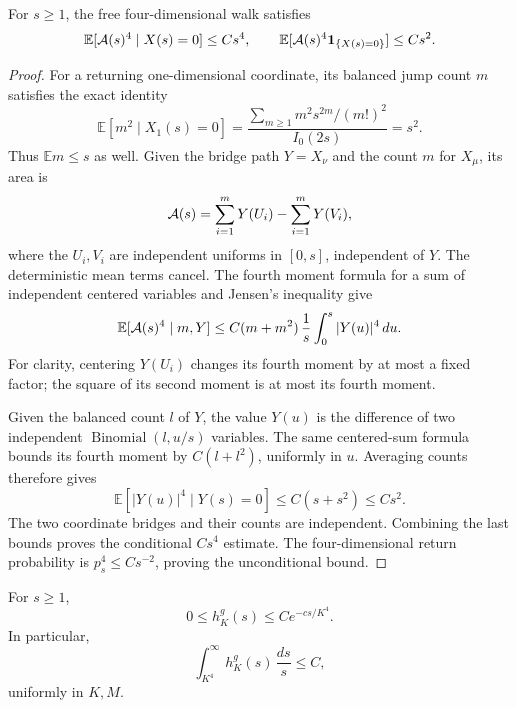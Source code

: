 \begin{lemma}
\label{pgl-area-fourth}
For \(s\ge1\), the free four-dimensional walk satisfies
\begin{equation}
 \mathbb E[{\cal A}(s)^4\mid X(s)=0]\le Cs^4,\qquad
 \mathbb E[{\cal A}(s)^4{\bf1}_{\{X(s)=0\}}]\le Cs^2.
 \label{pgl-fourth-bound}
\end{equation}
\end{lemma}

\begin{proof}
For a returning one-dimensional coordinate, its
balanced jump count \(m\) satisfies the exact identity
\[
 \mathbb E[m^2\mid X_1(s)=0]
 =\frac{\sum_{m\ge1}m^2s^{2m}/(m!)^2}{I_0(2s)}
 =s^2.
\]
Thus \(\mathbb E m\le s\) as well. Given the bridge
path \(Y=X_\nu\) and the count \(m\) for \(X_\mu\),
its area is
\[
 {\cal A}(s)=\sum_{i=1}^m Y(U_i)-\sum_{i=1}^m Y(V_i),
\]
where the \(U_i,V_i\) are independent uniforms in
\([0,s]\), independent of \(Y\). The deterministic
mean terms cancel. The fourth moment formula for a
sum of independent centered variables and Jensen's
inequality give
\[
 \mathbb E[{\cal A}(s)^4\mid m,Y]
 \le C(m+m^2)\,\frac1s\int_0^s|Y(u)|^4\,du.
\]
For clarity, centering \(Y(U_i)\) changes its fourth
moment by at most a fixed factor; the square of its
second moment is at most its fourth moment.

Given the balanced count \(l\) of \(Y\), the value
\(Y(u)\) is the difference of two independent
\(\operatorname{Binomial}(l,u/s)\) variables.
The same centered-sum formula bounds its fourth
moment by \(C(l+l^2)\), uniformly in \(u\).
Averaging counts therefore gives
\[
 \mathbb E[|Y(u)|^4\mid Y(s)=0]\le C(s+s^2)\le Cs^2.
\]
The two coordinate bridges and their counts are
independent. Combining the last bounds proves
the conditional \(Cs^4\) estimate. The four-dimensional
return probability is \(p_s^4\le Cs^{-2}\), proving
the unconditional bound.
\end{proof}

\begin{proposition}
\label{pgl-tail}
For \(s\ge1\),
\begin{equation}
 0\le h_K^g(s)\le C e^{-c s/K^4}.
 \label{pgl-ghost-tail-pointwise}
\end{equation}
In particular,
\begin{equation}
           \int_{K^4}^\infty h_K^g(s)\,\frac{ds}{s}\le C,
 \label{pgl-tail-integral}
\end{equation}
uniformly in \(K,M\).
\end{proposition}


